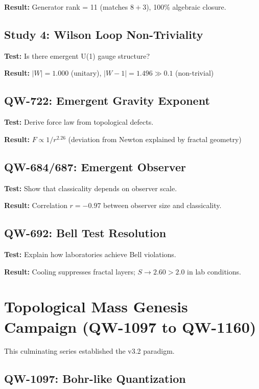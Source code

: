 \documentclass[11pt,a4paper]{book}
\theoremstyle{remark}
\begin{document}
\textbf{Result:} Generator rank = 11 (matches $8 + 3$), 100\% algebraic closure.

\subsection{Study 4: Wilson Loop Non-Triviality}

\textbf{Test:} Is there emergent U(1) gauge structure?

\textbf{Result:} $|W| = 1.000$ (unitary), $|W-1| = 1.496 \gg 0.1$ (non-trivial)

\subsection{QW-722: Emergent Gravity Exponent}

\textbf{Test:} Derive force law from topological defects.

\textbf{Result:} $F \propto 1/r^{2.26}$ (deviation from Newton explained by fractal geometry)

\subsection{QW-684/687: Emergent Observer}

\textbf{Test:} Show that classicality depends on observer scale.

\textbf{Result:} Correlation $r = -0.97$ between observer size and classicality.

\subsection{QW-692: Bell Test Resolution}

\textbf{Test:} Explain how laboratories achieve Bell violations.

\textbf{Result:} Cooling suppresses fractal layers; $S \rightarrow 2.60 > 2.0$ in lab conditions.

\section{Topological Mass Genesis Campaign (QW-1097 to QW-1160)}

This culminating series established the v3.2 paradigm.

\subsection{QW-1097: Bohr-like Quantization}
\end{document}
